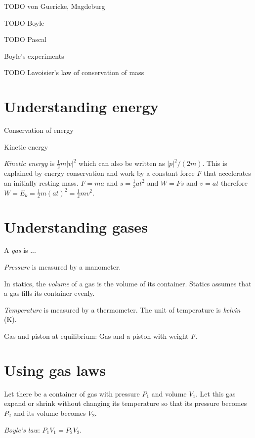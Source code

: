 TODO von Guericke, Magdeburg

TODO Boyle

TODO Pascal

Boyle's experiments

%
TODO Lavoisier's law of conservation of mass

\section{Understanding energy}

Conservation of energy

Kinetic energy

\emph{Kinetic energy} is \( \frac{1}{2} m |v|^2 \) which can also be written as \( |p|^2 / (2m) \).
This is explained by energy conservation and work by a constant force \(F\) that accelerates an initially resting mass.
\(F = ma\) and \(s = \frac{1}{2}at^2\) and \( W = Fs \) and \( v = at \) therefore \( W = E_k = \frac{1}{2} m(at)^2 = \frac{1}{2}mv^2 \).

\section{Understanding gases}


A \emph{gas} is ...

\emph{Pressure} is measured by a manometer.

In statics, the \emph{volume} of a gas is the volume of its container.
Statics assumes that a gas fills its container evenly.

\emph{Temperature} is measured by a thermometer.
The unit of temperature is \emph{kelvin} (K).

Gas and piston at equilibrium:
Gas and a piston with weight \(F\).

\section{Using gas laws}

Let there be a container of gas with pressure \(P_1\) and volume \(V_1\).
Let this gas expand or shrink without changing its temperature
so that its pressure becomes \(P_2\) and its volume becomes \(V_2\).

%
%
%
\emph{Boyle's law}: \( P_1 V_1 = P_2 V_2 \).

